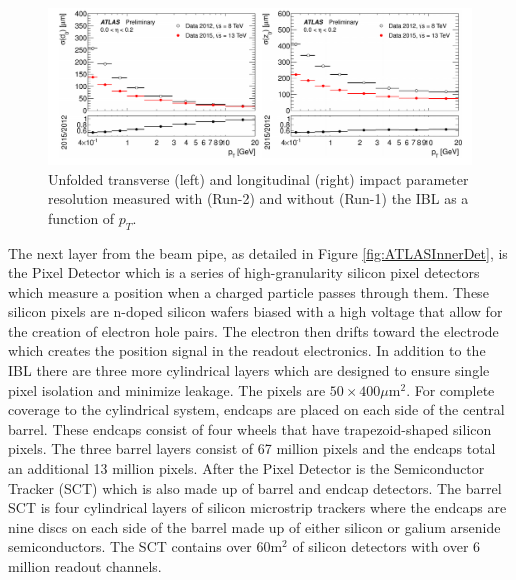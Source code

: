 \begin{figure}[ht!]
	\centering
	\includegraphics[width=\columnwidth]{../ThesisImages/LHCImages/tracking.png}
	\caption[Unfolded transverse (left) and longitudinal (right) impact parameter resolutions measured with (Run-2) and without (Run-1) the IBL as a function of $p_T$.]{Unfolded transverse (left) and longitudinal (right) impact parameter resolution measured with (Run-2) and without (Run-1) the IBL as a function of $p_T$\cite{Takubo:2017wvt}.
	}
	\label{fig:impParamIBL}
\end{figure}

The next layer from the beam pipe, as detailed in Figure \ref{fig:ATLASInnerDet}, is the Pixel Detector which is a series of high-granularity silicon pixel detectors which measure a position when a charged particle passes through them.  These silicon pixels are n-doped silicon wafers biased with a high voltage that allow for the creation of electron hole pairs.  The electron then drifts toward the electrode which creates the position signal in the readout electronics.  In addition to the IBL there are three more cylindrical layers which are designed to ensure single pixel isolation and minimize leakage.  The pixels are $50 \times 400\mu\text{m}^2$.  For complete coverage to the cylindrical system, endcaps are placed on each side of the central barrel.  These endcaps consist of four wheels that have trapezoid-shaped silicon pixels.  The three barrel layers consist of 67 million pixels and the endcaps total an additional 13 million pixels.
After the Pixel Detector is the Semiconductor Tracker (SCT) which is also made up of barrel and endcap detectors.  The barrel SCT is four cylindrical layers of silicon microstrip trackers where the endcaps are nine discs on each side of the barrel made up of either silicon or galium arsenide semiconductors.  The SCT contains over $60\text{m}^2$ of silicon detectors with over 6 million readout channels.

